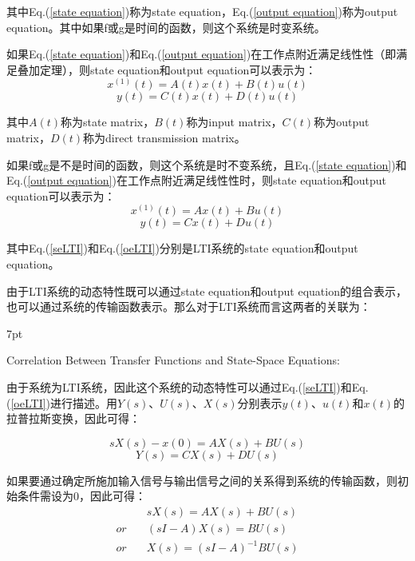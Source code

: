 \documentclass{article}
\numberwithin{equation}{section}
\numberwithin{figure}{section}
\newenvironment{formal}{%
\def\FrameCommand{%
\hspace{1pt}%
{\color{DarkBlue}\vrule width 2pt}%
{\color{formalshade}\vrule width 4pt}%
\colorbox{formalshade}%
}%
\MakeFramed{\advance\hsize-\width\FrameRestore}%
\noindent\hspace{-4.55pt}%
\begin{adjustwidth}{}{7pt}%
\vspace{2pt}\vspace{2pt}%
}
{%
\vspace{2pt}\end{adjustwidth}\endMakeFramed%
}
\begin{document}
其中Eq.(\ref{state equation})称为state equation，Eq.(\ref{output equation})称为output equation。其中如果f或g是时间的函数，则这个系统是时变系统。

如果Eq.(\ref{state equation})和Eq.(\ref{output equation})在工作点附近满足线性性（即满足叠加定理），则state equation和output equation可以表示为：
\begin{equation}
    x^{(1)}(t)=A(t)x(t)+B(t)u(t)
\end{equation}
\begin{equation}
    y(t)=C(t)x(t)+D(t)u(t)
\end{equation}

其中$A(t)$称为state matrix，$B(t)$称为input matrix，$C(t)$称为output matrix，$D(t)$称为direct transmission matrix。

如果f或g是不是时间的函数，则这个系统是时不变系统，且Eq.(\ref{state equation})和Eq.(\ref{output equation})在工作点附近满足线性性时，则state equation和output equation可以表示为：
\begin{equation}
    x^{(1)}(t)=Ax(t)+Bu(t)\label{seLTI}
\end{equation}
\begin{equation}
    y(t)=Cx(t)+Du(t)\label{oeLTI}
\end{equation}

其中Eq.(\ref{seLTI})和Eq.(\ref{oeLTI})分别是LTI系统的state equation和output equation。

由于LTI系统的动态特性既可以通过state equation和output equation的组合表示，也可以通过系统的传输函数表示。那么对于LTI系统而言这两者的关联为：

\begin{formal}
    Correlation Between Transfer Functions and State-Space Equations:
\end{formal}

由于系统为LTI系统，因此这个系统的动态特性可以通过Eq.(\ref{seLTI})和Eq.(\ref{oeLTI})进行描述。用$Y(s)、U(s)、X(s)$分别表示$y(t)、u(t)和x(t)$的拉普拉斯变换，因此可得：

\begin{equation}
    sX(s)-x(0)=AX(s)+BU(s)
\end{equation}
\begin{equation}
    Y(s)=CX(s)+DU(s)
\end{equation}

如果要通过确定所施加输入信号与输出信号之间的关系得到系统的传输函数，则初始条件需设为0，因此可得：
\begin{equation}
    \begin{split}
        &sX(s)=AX(s)+BU(s)\\
        or \quad &(sI-A)X(s)=BU(s)\\
        or \quad &X(s)=(sI-A)^{-1}BU(s)
    \end{split}
\end{equation}
\end{document}
